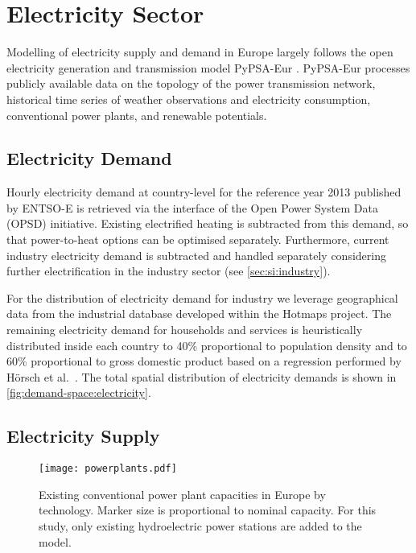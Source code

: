 \section{Electricity Sector}
\label{sec:si:electricity}

Modelling of electricity supply and demand in Europe largely follows the open
electricity generation and transmission model PyPSA-Eur
. PyPSA-Eur processes publicly available data on
the topology of the power transmission network, historical time series of
weather observations and electricity consumption, conventional power plants, and
renewable potentials.

\subsection{Electricity Demand}
\label{sec:si:electricity:demand}

Hourly electricity demand at country-level for the reference year 2013 published
by ENTSO-E is retrieved via the interface of the Open Power System Data (OPSD)
initiative. Existing electrified heating is subtracted from this
demand, so that power-to-heat options can be optimised separately. Furthermore,
current industry electricity demand is subtracted and handled separately
considering further electrification in the industry sector (see \cref{sec:si:industry}).

For the distribution of electricity demand for industry we leverage geographical
data from the industrial database developed within the Hotmaps project.
 The remaining
electricity demand for households and services is heuristically distributed
inside each country to 40\% proportional to population density and to 60\%
proportional to gross domestic product based on a regression performed by Hörsch
et al.~. The total spatial distribution of
electricity demands is shown in \cref{fig:demand-space:electricity}.

\subsection{Electricity Supply}

\begin{SCfigure}
    \caption{ Existing conventional power plant capacities in Europe by
        technology. Marker size is proportional to nominal capacity. For this
        study, only existing hydroelectric power stations are added to the
        model.}
    \label{fig:powerplants}
    \texttt{[image: powerplants.pdf]}
\end{SCfigure}

